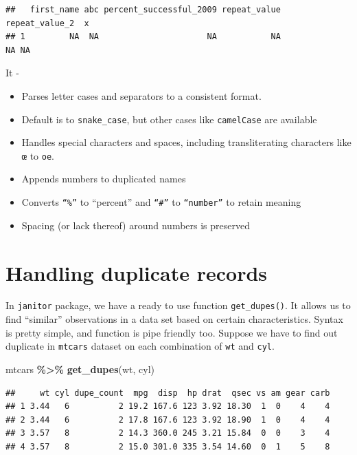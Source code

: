 \documentclass[
]{book}
\newenvironment{Shaded}{\begin{snugshade}}{\end{snugshade}}
\newcommand{\FunctionTok}[1]{\textcolor[rgb]{0.13,0.29,0.53}{\textbf{#1}}}
\newcommand{\NormalTok}[1]{#1}
\newcommand{\SpecialCharTok}[1]{\textcolor[rgb]{0.81,0.36,0.00}{\textbf{#1}}}
\providecommand{\tightlist}{%
  \setlength{\itemsep}{0pt}\setlength{\parskip}{0pt}}
\begin{document}
\begin{verbatim}
##   first_name abc percent_successful_2009 repeat_value repeat_value_2  x
## 1         NA  NA                      NA           NA             NA NA
\end{verbatim}

It -

\begin{itemize}
\tightlist
\item
  Parses letter cases and separators to a consistent format.
\item
  Default is to \texttt{snake\_case}, but other cases like \texttt{camelCase} are available
\item
  Handles special characters and spaces, including transliterating characters like \texttt{œ} to \texttt{oe}.
\item
  Appends numbers to duplicated names
\item
  Converts \texttt{“\%”} to ``percent'' and \texttt{“\#”} to \texttt{“number”} to retain meaning
\item
  Spacing (or lack thereof) around numbers is preserved
\end{itemize}

\hypertarget{handling-duplicate-records}{%
\section{Handling duplicate records}\label{handling-duplicate-records}}

In \texttt{janitor} package, we have a ready to use function \texttt{get\_dupes()}. It allows us to find ``similar'' observations in a data set based on certain characteristics. Syntax is pretty simple, and function is pipe friendly too. Suppose we have to find out duplicate in \texttt{mtcars} dataset on each combination of \texttt{wt} and \texttt{cyl}.

\begin{Shaded}
\begin{Highlighting}[]
\NormalTok{mtcars }\SpecialCharTok{\%\textgreater{}\%} 
  \FunctionTok{get\_dupes}\NormalTok{(wt, cyl)}
\end{Highlighting}
\end{Shaded}

\begin{verbatim}
##     wt cyl dupe_count  mpg  disp  hp drat  qsec vs am gear carb
## 1 3.44   6          2 19.2 167.6 123 3.92 18.30  1  0    4    4
## 2 3.44   6          2 17.8 167.6 123 3.92 18.90  1  0    4    4
## 3 3.57   8          2 14.3 360.0 245 3.21 15.84  0  0    3    4
## 4 3.57   8          2 15.0 301.0 335 3.54 14.60  0  1    5    8
\end{verbatim}
\end{document}
